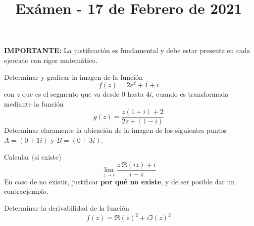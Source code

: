 \documentclass[11pt]{article}
\title{Exámen - 17 de Febrero de 2021}
\begin{document}
 
\let\>=\rangle
\let\<=\langle
\let\pe=\preccurlyeq
\let\minus=\smallsetminus
\let\phi=\varphi
\let\w=\omega
\let\a=\alpha
\let\b=\beta
\def\Z{{\mathbb Z}}
\let\iff=\leftrightarrow
\let\Iff=\Leftrightarrow


\textbf{IMPORTANTE:} La justificación es fundamental y debe estar presente en cada ejercicio con rigor matemático.


\begin{questions}
\question Determinar y graficar la imagen de la función
$$f(z)=2 e^{z}+1+i$$
 con $z$ que es el segmento que va desde $0$ hasta $4i$, cuando es transformada mediante la función
 $$g(z)=\frac{z(1+i)+2}{2z+(1-i)}$$
 Determinar claramente la ubicación de la imagen de los siguientes puntos $A=(0 + 1i)$ y $B= (0+3i)$.


\question Calcular (si existe)
$$ \lim_{z \to i} \frac{z\,\Re(iz)+ i}{i-z} $$
En caso de no existir, justificar {\bfseries{ por qué no existe}}, y de ser posible dar un contraejemplo.

\question Determinar la derivabilidad de la función
$$f(z)= \mathrm{\Re }(\overline{z})^2 +i \mathrm{\Im }(z)^2$$
  


\end{questions}
\end{document}
